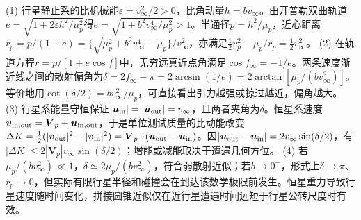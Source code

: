 (1) 行星静止系的比机械能\(\varepsilon=v_\infty^2/2>0\)，比角动量\(h=bv_\infty\)。由开普勒双曲轨道\(e=\sqrt{1+2\varepsilon h^2/\mu_p^2}\)得\(e=\sqrt{1+b^2v_\infty^4/\mu_p^2}>1\)。半通径\(p=h^2/\mu_p\)，近心距离\(r_p=p/(1+e)=\{\sqrt{\mu_p^2+b^2v_\infty^4}-\mu_p\}/v_\infty^2\)，亦满足\(\frac12v_p^2-\mu_p/r_p=\frac12v_\infty^2\)。
(2) 在轨道方程\(r=p/[1+e\cos f]\)中，无穷远真近点角满足\(\cos f_\infty=-1/e\)。两条速度渐近线之间的散射偏角为\(\delta=2f_\infty-\pi=2\arcsin(1/e)=2\arctan[\mu_p/(bv_\infty^2)]\)。等价地用\(\cot(\delta/2)=bv_\infty^2/\mu_p\)，可直接看出引力越强或掠过越近，偏角越大。
(3) 行星系能量守恒保证\(|\boldsymbol u_{\rm in}|=|\boldsymbol u_{\rm out}|=v_\infty\)，且两者夹角为\(\delta\)。恒星系速度\(\boldsymbol v_{\rm in,out}=\boldsymbol V_p+\boldsymbol u_{\rm in,out}\)，于是单位测试质量的比动能改变\(\Delta K=\frac12(|\boldsymbol v_{\rm out}|^2-|\boldsymbol v_{\rm in}|^2)=\boldsymbol V_p\cdot(\boldsymbol u_{\rm out}-\boldsymbol u_{\rm in})\)。因\(|\boldsymbol u_{\rm out}-\boldsymbol u_{\rm in}|=2v_\infty\sin(\delta/2)\)，有\(|\Delta K|\le2|\boldsymbol V_p|v_\infty\sin(\delta/2)\)；增能或减能取决于遭遇几何方位。
(4) 若\(\mu_p/(bv_\infty^2)\ll1\)，\(\delta\simeq2\mu_p/(bv_\infty^2)\)，符合弱散射近似；若\(b\to0^+\)，形式上\(\delta\to\pi\)、\(r_p\to0\)，但实际有限行星半径和碰撞会在到达该数学极限前发生。恒星重力导致行星速度随时间变化，拼接圆锥近似仅在近行星遭遇时间远短于行星公转尺度时有效。
